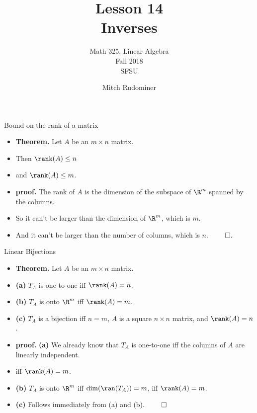 \documentclass{beamer}
\title{Lesson 14 \\ Inverses}
\subtitle{Math 325, Linear Algebra \\ Fall 2018 \\ SFSU}
\author{Mitch Rudominer}
\date{}
\begin{document}
\begin{frame}
  \titlepage
\end{frame}


\begin{frame}{Bound on the rank of a matrix}

\begin{itemize}
\item \textbf{Theorem.} Let $A$ be an $m\times n$ matrix.
\item Then $\rank(A) \leq n$
\item and $\rank(A) \leq m$.
\item \textbf{proof.} The rank of $A$ is the dimension of the subspace
of $\R^m$  spanned by the columns.
\item So it can't be larger than the dimension of $\R^m$, which is $m$.
\item And it can't be larger than the number of columns, which is $n$. $\qed$.
\end{itemize}
\end{frame}


\begin{frame}{Linear Bijections}

\begin{itemize}
\item \textbf{Theorem.} Let $A$ be an $m\times n$ matrix.
\item \textbf{(a)} $T_A$ is one-to-one iff $\rank(A) = n$.
\item \textbf{(b)} $T_A$ is onto $\R^m$ iff $\rank(A) = m$.
\item \textbf{(c)} $T_A$ is a bijection iff $n=m$, $A$ is a square $n\times n$ matrix, and $\rank(A) = n$.
\item \textbf{proof.} \textbf{(a)} We already know that $T_A$ is one-to-one iff the
columns of $A$ are linearly independent.
\item iff $\rank(A) = m$.
\item \textbf{(b)} $T_A$ is onto $\R^m$ iff $\dim(\ran(T_A)) = m$, iff $\rank(A) = m$.
\item \textbf{(c)} Follows immediately from (a) and (b). $\qed$
\end{itemize}
\end{frame}

\end{document}
